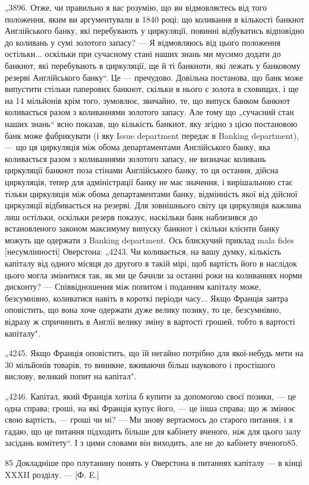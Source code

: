 „3896. Отже, чи правильно я вас розумію, що ви відмовляєтесь
від того положення, яким ви аргументували в 1840 році: що коливання в кількості банкнот Англійського
банку, які перебувають
у циркуляції, повинні відбуватись відповідно до коливань у сумі
золотого запасу? — Я відмовляюсь від цього положення остільки...
оскільки при сучасному стані наших знань ми мусимо додати до
банкнот, які перебувають в циркуляції, ще й ті банкноти, які
лежать у банковому резерві Англійського банку“. Це — пречудово. Довільна постанова, що банк може
випустити стільки
паперових банкнот, скільки в нього є золота в сховищах, і ще на
14 мільйонів крім того, зумовлює, звичайно, те, що випуск банком
банкнот коливається разом з коливаннями золотого запасу. Але
тому що „сучасний стан наших знань“ ясно показав, що кількість
банкнот, яку згідно з цією постановою банк може фабрикувати (і яку
Issue department передає в Banking department), — що ця циркуляція
між обома департаментами Англійського банку, яка коливається
разом з коливаннями золотого запасу, не визначає коливань
циркуляції банкнот поза стінами Англійського банку, то ця
остання, дійсна циркуляція, тепер для адміністрації банку не має
значення, і вирішальною стає тільки циркуляція між обома
департаментами банку, відмінність якої від дійсної циркуляції
відбивається на резерві. Для зовнішнього світу ця циркуляція
важлива лиш остільки, оскільки резерв показує, наскільки банк
наблизився до встановленого законом максимуму випуску банкнот і
скільки клієнти банку можуть ще одержати з Banking department.
Ось блискучий приклад mala fides [несумлінності] Оверстона:
„4243. Чи коливається, на вашу думку, кількість капіталу від
одного місяця до другого в такій мірі, щоб вартість його в наслідок цього могла змінитися так, як ми
це бачили за
останні роки на коливаннях норми дисконту? — Співвідношення
між попитом і поданням капіталу може, безсумнівно, коливатися навіть в короткі періоди часу... Якщо
Франція завтра оповістить, що вона хоче одержати дуже велику позику, то це, безсумнівно, відразу ж
спричинить в Англії велику зміну в вартості грошей, тобто в вартості капіталу".

„4245. Якщо Франція оповістить, що їй негайно потрібно для
якої-небудь мети на 30 мільйонів товарів, то виникне, вживаючи
більш наукового і простішого вислову, великий попит на капітал".

„4246. Капітал, який Франція хотіла б купити за допомогою
своєї позики, — це одна справа; гроші, на які Франція купує його, — це інша справа; що ж змінює свою
вартість, — гроші чи ні? — Ми знову вертаємось до старого питання, і я гадаю, що це питання
підходить більше для кабінету вченого, ніж для цього залу засідань комітету“. І з цими словами він
виходить, але не
до кабінету вченого85.

85 Докладніше про плутанину понять у Оверстона в питаннях капіталу — в кінці XXXII розділу. — [Ф.
E.]
